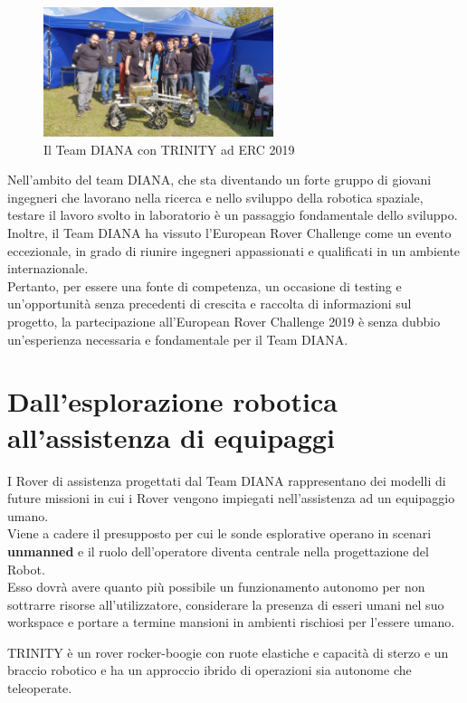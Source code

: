 \documentclass[%
corpo=11pt,
twoside,
 stile=classica,
oldstyle,
greek,%
]{toptesi}
\begin{document}
\begin{figure}
	\centering
	\includegraphics[width=0.6\textwidth]{image/trinityerc.jpeg}
	\caption{Il Team DIANA con TRINITY ad ERC 2019}
	\label{fig:trinityerc}
\end{figure}


Nell'ambito del team DIANA, che sta diventando un forte gruppo di giovani ingegneri che lavorano nella ricerca e nello sviluppo della robotica spaziale, testare il lavoro svolto in laboratorio è un passaggio fondamentale dello sviluppo.\\
Inoltre, il Team DIANA ha vissuto l'European Rover Challenge come un evento eccezionale, in grado di riunire ingegneri appassionati e qualificati in un ambiente internazionale.\\

Pertanto, per essere una fonte di competenza, un occasione di testing e un'opportunità senza precedenti di crescita e raccolta di informazioni sul progetto, la partecipazione all'European Rover Challenge 2019 è senza dubbio un'esperienza necessaria e fondamentale per il Team DIANA.\\

	\section{Dall'esplorazione robotica all'assistenza di equipaggi}
	I Rover di assistenza progettati dal Team DIANA rappresentano dei modelli di future missioni in cui i Rover vengono impiegati nell'assistenza ad un equipaggio umano. \\
	Viene a cadere il presupposto per cui le sonde esplorative operano in scenari \textbf{unmanned} e il ruolo dell'operatore diventa centrale nella progettazione del Robot.\\
	 Esso dovrà avere quanto più possibile un funzionamento autonomo per non sottrarre risorse all'utilizzatore, considerare la presenza di esseri umani nel suo workspace e portare a termine mansioni in ambienti rischiosi per l'essere umano. 
	
	TRINITY è un rover rocker-boogie con ruote elastiche e capacità di sterzo e un braccio robotico e ha un approccio ibrido di operazioni sia autonome che teleoperate.
	
\end{document}
